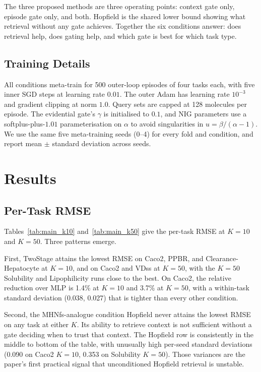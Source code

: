 \documentclass{article}
\theoremstyle{plain}
\theoremstyle{definition}
\theoremstyle{remark}
\begin{document}
The three proposed methods are three operating points: context gate only, episode gate only, and both. Hopfield is the shared lower bound showing what retrieval without any gate achieves. Together the six conditions answer: does retrieval help, does gating help, and which gate is best for which task type.

\subsection{Training Details}

All conditions meta-train for 500 outer-loop episodes of four tasks each, with five inner SGD steps at learning rate $0.01$. The outer Adam has learning rate $10^{-3}$ and gradient clipping at norm $1.0$. Query sets are capped at 128 molecules per episode. The evidential gate's $\gamma$ is initialised to $0.1$, and NIG parameters use a softplus-plus-$1.01$ parameterisation on $\alpha$ to avoid singularities in $u=\beta/(\alpha-1)$. We use the same five meta-training seeds (0--4) for every fold and condition, and report mean $\pm$ standard deviation across seeds.


\section{Results}
\label{sec:results}

\subsection{Per-Task RMSE}





Tables~\ref{tab:main_k10} and~\ref{tab:main_k50} give the per-task RMSE at $K\!=\!10$ and $K\!=\!50$. Three patterns emerge.

First, TwoStage attains the lowest RMSE on Caco2, PPBR, and Clearance-Hepatocyte at $K\!=\!10$, and on Caco2 and VDss at $K\!=\!50$, with the $K\!=\!50$ Solubility and Lipophilicity runs close to the best. On Caco2, the relative reduction over MLP is 1.4\% at $K\!=\!10$ and 3.7\% at $K\!=\!50$, with a within-task standard deviation (0.038, 0.027) that is tighter than every other condition.

Second, the MHNfs-analogue condition Hopfield never attains the lowest RMSE on any task at either $K$. Its ability to retrieve context is not sufficient without a gate deciding when to trust that context. The Hopfield row is consistently in the middle to bottom of the table, with unusually high per-seed standard deviations (0.090 on Caco2 $K\!=\!10$, 0.353 on Solubility $K\!=\!50$). Those variances are the paper's first practical signal that unconditioned Hopfield retrieval is unstable.
\end{document}
